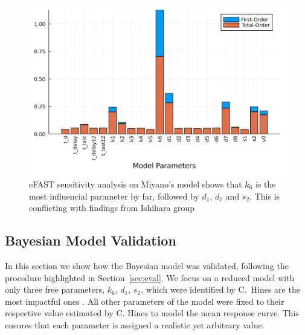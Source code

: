 \documentclass[11pt]{article}
\begin{document}
\begin{figure}[!ht]
    \centering\includegraphics[scale=0.07]{proutiprouta.png}
    \caption{eFAST sensitivity analysis on Miyano's model shows that $k_6$ is the most influencial parameter by far, followed by $d_1$, $d_7$ and $s_2$. This is conflicting with findings from Ishihara group}
    \label{fig:efast}
\end{figure}

\subsection{Bayesian Model Validation}
In this section we show how the Bayesian model was validated, following the procedure highlighted in Section~\ref{sec:eval}. We focus on a reduced model with only three free parameters, $k_6$, $d_1$, $s_2$, which were identified by C.~Hines are the most impactful ones \cite{christian1}. All other parameters of the model were fixed to their respective value estimated by C. Hines to model the mean response curve. This ensures that each parameter is assigned a realistic yet arbitrary value.
\end{document}

